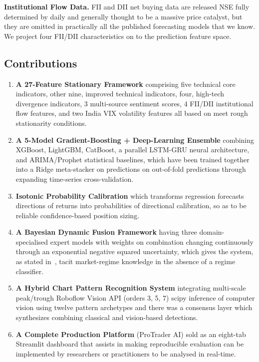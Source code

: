 \documentclass[10pt,a4paper,twoside]{article}
\begin{document}
\textbf{Institutional Flow Data.} FII and DII net buying data are released NSE
fully determined by daily and generally thought to be a massive price catalyst,
but they are omitted in practically all the published forecasting models that
we know. We project four FII/DII characteristics on to the prediction feature
space.

\subsection{Contributions}

\begin{enumerate}
\item \textbf{A 27-Feature Stationary Framework} comprising five technical core
  indicators, other nine, improved technical indicators, four, high-tech divergence
  indicators, 3 multi-source sentiment scores, 4 FII/DII institutional
  flow features, and two India VIX volatility features all based on
  meet rough stationarity conditions.

\item \textbf{A 5-Model Gradient-Boosting + Deep-Learning Ensemble} combining
  XGBoost, LightGBM, CatBoost, a parallel LSTM-GRU neural architecture, and
  ARIMA/Prophet statistical baselines, which have been trained together into a Ridge meta-stacker
  on predictions on out-of-fold predictions through expanding time-series cross-validation.

\item \textbf{Isotonic Probability Calibration} which transforms regression
  forecasts directions of returns into probabilities of directional calibration, so as to be reliable
  confidence-based position sizing.

\item \textbf{A Bayesian Dynamic Fusion Framework} having three domain-specialised
  expert models with weights on combination changing continuously through
  an exponential negative squared uncertainty, which gives the system, as stated in~\cite{gal2016},
  tacit market-regime knowledge in the absence of a regime classifier.

\item \textbf{A Hybrid Chart Pattern Recognition System} integrating multi-scale
  peak/trough Roboflow Vision API (orders 3, 5, 7) scipy
  inference of computer vision using twelve pattern archetypes and there was a consensus
  layer which synthesizes combining classical and vision-based detections.

\item \textbf{A Complete Production Platform} (ProTrader AI) sold as an
  eight-tab Streamlit dashboard that assists in making reproducible evaluation
  can be implemented by researchers or practitioners to be analysed in real-time.
\end{enumerate}
\end{document}
